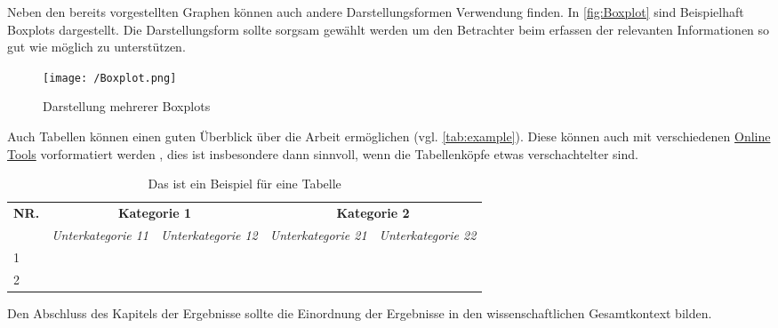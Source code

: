 Neben den bereits vorgestellten Graphen können auch andere Darstellungsformen Verwendung finden. In \autoref{fig:Boxplot} sind Beispielhaft Boxplots dargestellt. Die Darstellungsform sollte sorgsam gewählt werden um den Betrachter beim erfassen der relevanten Informationen so gut wie möglich zu unterstützen.

\begin{figure}[H]
	\centering
	\texttt{[image: /Boxplot.png]}
	\caption{Darstellung mehrerer Boxplots}
	\label{fig:Boxplot}
\end{figure}

Auch Tabellen können einen guten Überblick über die Arbeit ermöglichen (vgl. \autoref{tab:example}). Diese können auch mit verschiedenen \href{https://www.tablesgenerator.com/}{Online Tools} vorformatiert werden , dies ist insbesondere dann sinnvoll, wenn die Tabellenköpfe etwas verschachtelter sind.

\begin{table}[H]
	\caption{Das ist ein Beispiel für eine Tabelle}
	\label{tab:example}
	\begin{tabular}{|l|l|l|l|l|}
		\hline
		\multicolumn{1}{|c|}{\multirow{2}{*}{\textbf{NR.}}} & \multicolumn{2}{c|}{\textbf{Kategorie 1}}               & \multicolumn{2}{c|}{\textbf{Kategorie 2}}               \\ \cline{2-5} 
		\multicolumn{1}{|c|}{}                              & \textit{Unterkategorie 11} & \textit{Unterkategorie 12} & \textit{Unterkategorie 21} & \textit{Unterkategorie 22} \\ \hline
		1	&                            &                            &                            &                            \\ \hline
		2	&                            &                            &                            &                            \\ \hline
	\end{tabular}
\end{table}

Den Abschluss des Kapitels der Ergebnisse sollte die Einordnung der Ergebnisse in den wissenschaftlichen Gesamtkontext bilden. 
